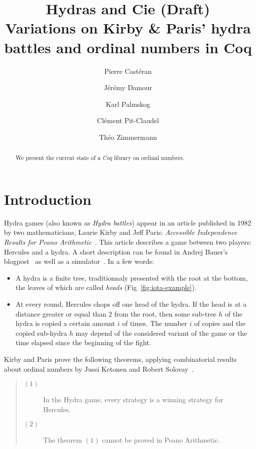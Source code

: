 \documentclass{easychair}
\title{Hydras and Cie (Draft) \\
  Variations on Kirby \& Paris' hydra battles and ordinal numbers in Coq}
\author{
Pierre Castéran \inst{1}
\and
    Jérémy Damour \inst{2}
\and
Karl Palmskog \inst{2}
\and Clément Pit-Claudel \inst{2}
\and Théo Zimmermann %
}
\institute{
 LaBRI, Université Bordeaux \\
  \email{pierre.casteran@labri.fr}
\and
   Ask for agreement !
 }
\begin{document}
\maketitle


\begin{abstract}
  We present the current state of a \textit{Coq} library on ordinal numbers.
 
\end{abstract}




\section{Introduction}
\label{sect:introduction}
Hydra games (also known as \emph{Hydra battles}) appear in an article published in 1982 by two mathematicians, 
Laurie Kirby and Jeff Paris: \emph{Accessible Independence Results for Peano Arithmetic}~\cite{KP82}.
This article describes a game between two players: Hercules and a hydra.
A short description  can be found in Andrej Bauer's blogpost~\cite{bauer2008} as well as a simulator~\cite{BauerHydra}.
In a few words:
\begin{itemize}
\item A hydra is a finite tree, traditionnaly presented with the root at the bottom, the leaves of which are called \emph{heads}
  (Fig~\vref{fig:iota-example}).
\item At every round, Hercules chops off one head of the hydra. If the head is at a distance greater or equal than 2 from the root,
  then some sub-tree $h$ of the hydra is copied a certain amount $i$ of times. The number $i$ of copies and the copied sub-hydra $h$ may depend of the considered variant of the game
  or the time elapsed since the beginning of the fight.
\end{itemize}


Kirby and Paris prove the following theorems, applying
combinatorial results about ordinal numbers by Jussi Ketonen and Robert Solovay~\cite{KS81}.

\begin{quote}
\begin{description}
\item[$(1)$] In the Hydra game, every strategy is a winning strategy for Hercules.
  \item[$(2)$] The theorem $(1)$ cannot be proved in Peano Arithmetic.
\end{description}
\end{quote}
\end{document}
